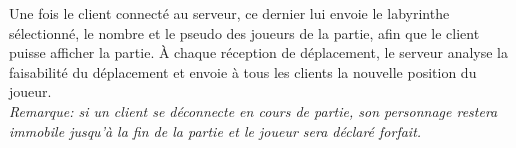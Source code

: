         Une fois le client connecté au serveur, ce dernier lui envoie le labyrinthe sélectionné, le nombre et le pseudo des joueurs de la partie, afin que le client puisse afficher la partie. À chaque réception de déplacement, le serveur analyse la faisabilité du déplacement et envoie à tous les clients la nouvelle position du joueur. \\

        \emph{Remarque: si un client se déconnecte en cours de partie, son personnage restera immobile jusqu'à la fin de la partie et le joueur sera déclaré forfait.}
